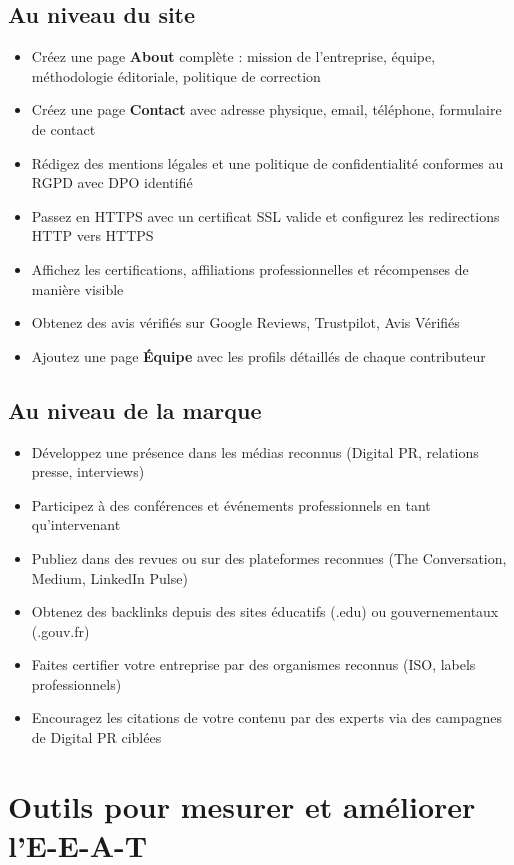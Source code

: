 \documentclass[12pt,a4paper,twoside]{report}
\newcommand{\keyword}[1]{\textbf{\textcolor{googleblue}{#1}}}
\begin{document}
\subsection{Au niveau du site}
\begin{itemize}
    \item Créez une page \keyword{About} complète : mission de l'entreprise, équipe, méthodologie éditoriale, politique de correction
    \item Créez une page \keyword{Contact} avec adresse physique, email, téléphone, formulaire de contact
    \item Rédigez des mentions légales et une politique de confidentialité conformes au RGPD avec DPO identifié
    \item Passez en HTTPS avec un certificat SSL valide et configurez les redirections HTTP vers HTTPS
    \item Affichez les certifications, affiliations professionnelles et récompenses de manière visible
    \item Obtenez des avis vérifiés sur Google Reviews, Trustpilot, Avis Vérifiés
    \item Ajoutez une page \keyword{Équipe} avec les profils détaillés de chaque contributeur
\end{itemize}

\subsection{Au niveau de la marque}
\begin{itemize}
    \item Développez une présence dans les médias reconnus (Digital PR, relations presse, interviews)
    \item Participez à des conférences et événements professionnels en tant qu'intervenant
    \item Publiez dans des revues ou sur des plateformes reconnues (The Conversation, Medium, LinkedIn Pulse)
    \item Obtenez des backlinks depuis des sites éducatifs (.edu) ou gouvernementaux (.gouv.fr)
    \item Faites certifier votre entreprise par des organismes reconnus (ISO, labels professionnels)
    \item Encouragez les citations de votre contenu par des experts via des campagnes de Digital PR ciblées
\end{itemize}

\section{Outils pour mesurer et améliorer l'E-E-A-T}
\end{document}
